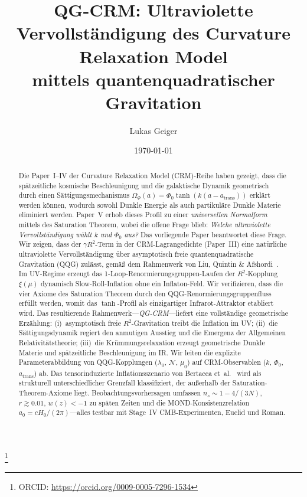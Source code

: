 \documentclass[aps,prd,twocolumn,superscriptaddress,nofootinbib]{revtex4-2}
\begin{document}

\title{QG-CRM: Ultraviolette Vervollständigung des Curvature Relaxation Model\\mittels quantenquadratischer Gravitation}

\author{Lukas Geiger}
\thanks{ORCID: \url{https://orcid.org/0009-0005-7296-1534}}

\date{\today}

\begin{abstract}
Die Paper~I--IV der Curvature Relaxation Model (CRM)-Reihe haben gezeigt, dass die spätzeitliche kosmische Beschleunigung und die galaktische Dynamik geometrisch durch einen Sättigungsmechanismus $\Omega_\Phi(a) = \Phi_0\tanh(k(a - a_\mathrm{trans}))$ erklärt werden können, wodurch sowohl Dunkle Energie als auch partikuläre Dunkle Materie eliminiert werden. Paper~V erhob dieses Profil zu einer \textit{universellen Normalform} mittels des Saturation Theorem, wobei die offene Frage blieb: \textit{Welche ultraviolette Vervollständigung wählt $k$ und $\Phi_0$ aus?} Das vorliegende Paper beantwortet diese Frage. Wir zeigen, dass der $\gamma R^2$-Term in der CRM-Lagrangedichte (Paper~III) eine natürliche ultraviolette Vervollständigung über asymptotisch freie quantenquadratische Gravitation (QQG) zulässt, gemäß dem Rahmenwerk von Liu, Quintin \& Afshordi~\cite{LiuQuintinAfshordi2026}. Im UV-Regime erzeugt das 1-Loop-Renormierungsgruppen-Laufen der $R^2$-Kopplung $\xi(\mu)$ dynamisch Slow-Roll-Inflation ohne ein Inflaton-Feld. Wir verifizieren, dass die vier Axiome des Saturation Theorem durch den QQG-Renormierungsgruppenfluss erfüllt werden, womit das $\tanh$-Profil als einzigartiger Infrarot-Attraktor etabliert wird. Das resultierende Rahmenwerk---\textit{QG-CRM}---liefert eine vollständige geometrische Erzählung: (i)~asymptotisch freie $R^2$-Gravitation treibt die Inflation im UV; (ii)~die Sättigungsdynamik regiert den anmutigen Ausstieg und die Emergenz der Allgemeinen Relativitätstheorie; (iii)~die Krümmungsrelaxation erzeugt geometrische Dunkle Materie und spätzeitliche Beschleunigung im IR. Wir leiten die explizite Parameterabbildung von QQG-Kopplungen ($\lambda_0$, $\mathcal{N}$, $\mu_0$) auf CRM-Observablen ($k$, $\Phi_0$, $a_\mathrm{trans}$) ab. Das tensorinduzierte Inflationsszenario von Bertacca et~al.~\cite{Bertacca2025} wird als strukturell unterschiedlicher Grenzfall klassifiziert, der außerhalb der Saturation-Theorem-Axiome liegt. Beobachtungsvorhersagen umfassen $n_s \sim 1 - 4/(3N)$, $r \gtrsim 0.01$, $w(z) < -1$ zu späten Zeiten und die MOND-Konsistenzrelation $a_0 = cH_0/(2\pi)$---alles testbar mit Stage~IV CMB-Experimenten, Euclid und Roman.
\end{abstract}
\end{document}

